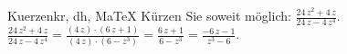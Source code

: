 \begin{MAufgabe}{Kuerzen}{kr, dh, MaTeX}
K\"urzen Sie soweit m\"oglich: $\frac{24\, z^2 + 4\, z}{24\, z - 4\, z^4}$.\\ 
\ifLsg\MLoesung
\quad $\frac{24\, z^2 + 4\, z}{24\, z - 4\, z^4}=\frac{(4\, z)\cdot(6\, z + 1)}{(4\, z)\cdot(6 - z^3)}=\frac{6\, z + 1}{6 - z^3}=\frac{ - 6\, z - 1}{z^3 - 6}$.\else\relax\fi
 \end{MAufgabe}